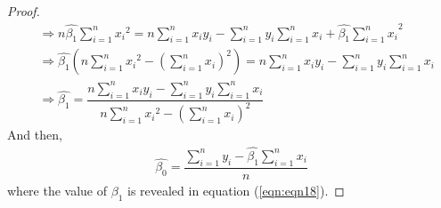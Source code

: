 \begin{answer}
\begin{proof}
\begin{align}
        & \Rightarrow n\hat{\beta_1}\sum_{i = 1}^{n}{{x_i}^2} = n\sum_{i = 1}^{n}{x_iy_i} -\sum_{i = 1}^{n}{y_i}\sum_{i = 1}^{n}{x_i} + \hat{\beta_1}{\sum_{i = 1}^{n}{x_i}}^2\\
        & \Rightarrow \hat{\beta_1} \left(n\sum_{i = 1}^{n}{{x_i}^2} - {\left(\sum_{i = 1}^{n}{x_i}\right)}^2\right) = n\sum_{i = 1}^{n}{x_iy_i} -\sum_{i = 1}^{n}{y_i}\sum_{i = 1}^{n}{x_i}\\
        & \Rightarrow \hat{\beta_1} = \dfrac{n\sum_{i = 1}^{n}{x_iy_i} -\sum_{i = 1}^{n}{y_i}\sum_{i = 1}^{n}{x_i}}{n\sum_{i = 1}^{n}{{x_i}^2} - {\left(\sum_{i = 1}^{n}{x_i}\right)}^2}\label{eqn:eqn18}
    \end{align}
    And then, 
    \begin{align}
        \hat{\beta_0} = \dfrac{\sum_{i = 1}^{n}{y_i} - \hat{\beta_1}\sum_{i = 1}^{n}{x_i}}{n}
    \end{align}
    where the value of $\beta_1$ is revealed in equation (\ref{eqn:eqn18}).
\end{proof}
\end{answer}